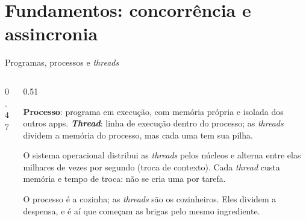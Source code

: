 \section{Fundamentos: concorrência e assincronia}

\begin{frame}{Programas, processos e \emph{threads}}
  \begin{columns}[c]
    \begin{column}{0.47\textwidth}
      \centering
    \end{column}
    \begin{column}{0.51\textwidth}
      \begin{definicao}
        \textbf{Processo}: programa em execução, com memória própria e isolada dos outros apps. \textbf{\emph{Thread}}: linha de execução dentro do processo; as \emph{threads} dividem a memória do processo, mas cada uma tem sua pilha.
      \end{definicao}
      \begin{pordentro}[O escalonador]
        O sistema operacional distribui as \emph{threads} pelos núcleos e alterna entre elas milhares de vezes por segundo (troca de contexto). Cada \emph{thread} custa memória e tempo de troca: não se cria uma por tarefa.
      \end{pordentro}
      \begin{analogia}
        O processo é a cozinha; as \emph{threads} são os cozinheiros. Eles dividem a despensa, e é aí que começam as brigas pelo mesmo ingrediente.
      \end{analogia}
    \end{column}
  \end{columns}
\end{frame}

